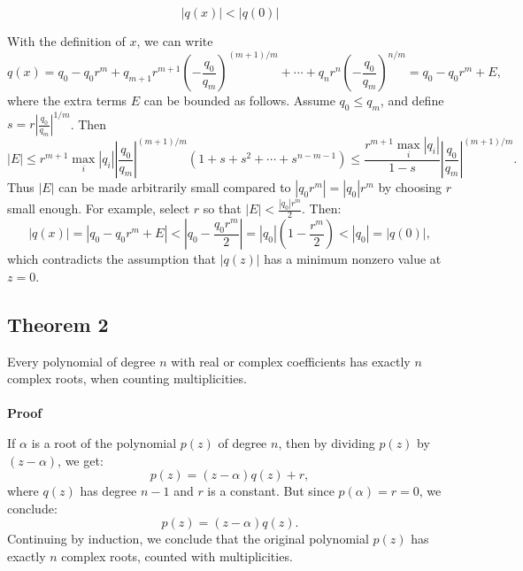 \[|q(x)| < |q(0)|\]

With the definition of \(x\), we can write
\[
	q(x) = q_0 - q_0 r^m + q_{m+1} r^{m+1} \left(-\frac{q_0}{q_m}\right)^{(m+1)/m} + \cdots + q_n r^n \left(-\frac{q_0}{q_m}\right)^{n/m} = q_0 - q_0 r^m + E,
\]
where the extra terms \(E\) can be bounded as follows. Assume \(q_0 \leq q_m\), and define \(s = r \left|\frac{q_0}{q_m}\right|^{1/m}\). Then
\[
	|E| \leq r^{m+1} \max_i |q_i| \left|\frac{q_0}{q_m}\right|^{(m+1)/m} (1 + s + s^2 + \cdots + s^{n - m - 1}) \leq \frac{r^{m+1} \max_i |q_i|}{1 - s} \left|\frac{q_0}{q_m}\right|^{(m+1)/m}.
\]
Thus \(|E|\) can be made arbitrarily small compared to \(|q_0 r^m| = |q_0| r^m\) by choosing \(r\) small enough. For example, select \(r\) so that \(|E| < \frac{|q_0| r^m}{2}\). Then:
\[
	|q(x)| = |q_0 - q_0 r^m + E| < |q_0 - \frac{q_0 r^m}{2}| = |q_0| \left(1 - \frac{r^m}{2}\right) < |q_0| = |q(0)|,
\]
which contradicts the assumption that \(|q(z)|\) has a minimum nonzero value at \(z = 0\).
\QED

\subsection{Theorem 2}
Every polynomial of degree \(n\) with real or complex coefficients has exactly \(n\) complex roots, when counting multiplicities.
\\\\
\textbf{Proof}

If \(\alpha\) is a root of the polynomial \(p(z)\) of degree \(n\), then by dividing \(p(z)\) by \((z - \alpha)\), we get:
\[
	p(z) = (z - \alpha) q(z) + r,
\]
where \(q(z)\) has degree \(n - 1\) and \(r\) is a constant. But since \(p(\alpha) = r = 0\), we conclude:
\[
	p(z) = (z - \alpha) q(z).
\]
Continuing by induction, we conclude that the original polynomial \(p(z)\) has exactly \(n\) complex roots, counted with multiplicities.

\QED
